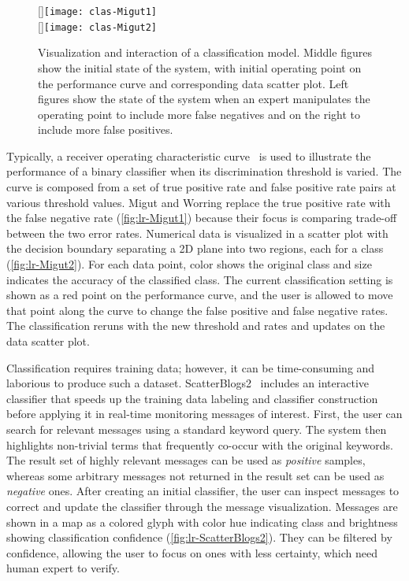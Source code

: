 \begin{figure}[!htb]
\centering
{}[\columnwidth]{\texttt{[image: clas-Migut1]}} 
\\
[\columnwidth]{\texttt{[image: clas-Migut2]}}
\caption[Visualization and interaction of a classification model]{Visualization and interaction of a classification model. Middle figures show the initial state of the system, with initial operating point on the performance curve and corresponding data scatter plot. Left figures show the state of the system when an expert manipulates the operating point to include more false negatives and on the right to include more false positives. }
\label{fig:lr-Migut}
\end{figure}

Typically, a receiver operating characteristic curve~\cite{Fawcett2006} is used to illustrate the performance of a binary classifier when its discrimination threshold is varied. The curve is composed from a set of true positive rate and false positive rate pairs at various threshold values. Migut and Worring replace the true positive rate with the false negative rate (\autoref{fig:lr-Migut1}) because their focus is comparing trade-off between the two error rates. Numerical data is visualized in a scatter plot with the decision boundary separating a 2D plane into two regions, each for a class (\autoref{fig:lr-Migut2}). For each data point, color shows the original class and size indicates the accuracy of the classified class. The current classification setting is shown as a red point on the performance curve, and the user is allowed to move that point along the curve to change the false positive and false negative rates. The classification reruns with the new threshold and rates and updates on the data scatter plot.

Classification requires training data; however, it can be time-consuming and laborious to produce such a dataset. ScatterBlogs2~\cite{Bosch2013} includes an interactive classifier that speeds up the training data labeling and classifier construction before applying it in real-time monitoring messages of interest. First, the user can search for relevant messages using a standard keyword query. The system then highlights non-trivial terms that frequently co-occur with the original keywords. The result set of highly relevant messages can be used as \emph{positive} samples, whereas some arbitrary messages not returned in the result set can be used as \emph{negative} ones. After creating an initial classifier, the user can inspect messages to correct and update the classifier through the message visualization. Messages are shown in a map as a colored glyph with color hue indicating class and brightness showing classification confidence (\autoref{fig:lr-ScatterBlogs2}). They can be filtered by confidence, allowing the user to focus on ones with less certainty, which need human expert to verify. 

